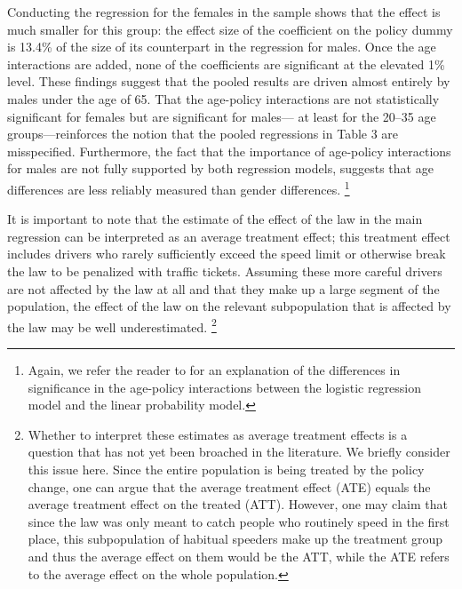 Conducting the regression for the females in the sample shows that 
the effect is much smaller for this group: 
the effect size of the coefficient on the policy dummy is 13.4\% of the size of its counterpart 
in the regression for males. 
Once the age interactions are added, none of the coefficients are significant at the elevated 1\% level. 
These findings suggest that the pooled results are driven almost entirely by males under the age of 65.
%
That the age-policy interactions are not statistically significant for females 
but are significant for males--- at least for the 20--35 age groups---reinforces 
the notion that the pooled regressions in Table 3 are misspecified. 
Furthermore, the fact that the importance of age-policy interactions for males 
are not fully supported by both regression models, suggests that 
age differences are less reliably measured than gender differences.%
\footnote{%
% 
Again, we refer the reader to \citet{ainorton2003}
for an explanation of the differences in significance in the age-policy interactions between the logistic regression model and the linear probability model. 
}
%

It is important to note that the estimate of the effect of the law in the main regression 
can be interpreted as an average treatment effect; 
this treatment effect includes drivers who rarely sufficiently exceed the speed limit 
or otherwise break the law to be penalized with traffic tickets. 
Assuming these more careful drivers are not affected by the law at all 
and that they make up a large segment of the population, 
the effect of the law on the relevant subpopulation that is affected by the law 
may be well underestimated.%
\footnote{%
Whether to interpret these estimates as average treatment effects 
is a question that has not yet been broached in the literature. 
We briefly consider this issue here. 
Since the entire population is being treated by the policy change, 
one can argue that the average treatment effect (ATE) equals 
the average treatment effect on the treated (ATT). 
However, one may claim that since the law was only meant to catch people 
who routinely speed in the first place, 
this subpopulation of habitual speeders make up the treatment group 
and thus the average effect on them would be the ATT, 
while the ATE refers to the average effect on the whole population.
}
%


